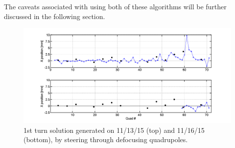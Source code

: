 The caveats associated with using both of these algorithms will be further discussed in the following section.



\begin{figure}[!h]
\includegraphics[width=\textwidth]{3.figures/quadscan_151113_151116.png}
\caption{1st turn solution generated on 11/13/15 (top) and 11/16/15 (bottom), by steering through defocusing quadrupoles.}
\label{fig:ring_steering}
\end{figure}


